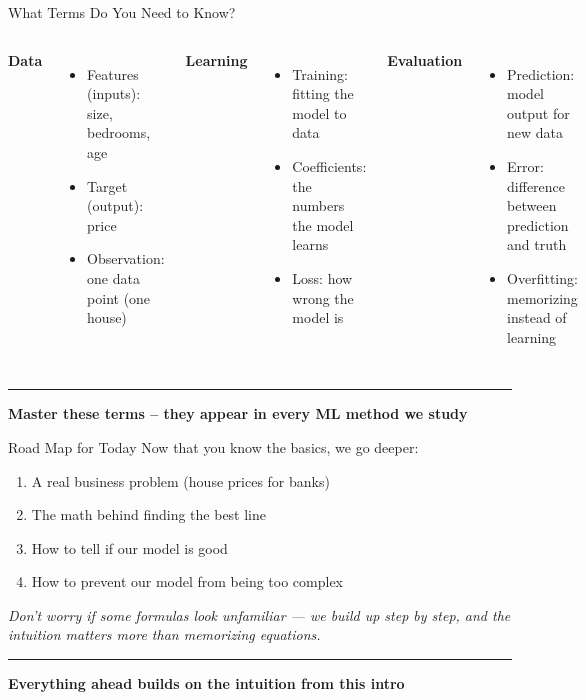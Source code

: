 \documentclass[8pt,aspectratio=169]{beamer}
\newcommand{\bottomnote}[1]{%
\vfill
\vspace{-2mm}
\textcolor{mllavender2}{\rule{\textwidth}{0.4pt}}
\vspace{1mm}
\footnotesize
\textbf{#1}
}
\newenvironment{compactlist}{%
  \begin{itemize}%
    \setlength{\itemsep}{2pt}%
    \setlength{\parskip}{0pt}%
    \setlength{\parsep}{0pt}%
}{%
  \end{itemize}%
}
\begin{document}
\begin{frame}[t]{What Terms Do You Need to Know?}
\begin{columns}[T]
\textbf{Data}

\begin{compactlist}
  \item Features (inputs): size, bedrooms, age
  \item Target (output): price
  \item Observation: one data point (one house)
\end{compactlist}

\textbf{Learning}

\begin{compactlist}
  \item Training: fitting the model to data
  \item Coefficients: the numbers the model learns
  \item Loss: how wrong the model is
\end{compactlist}

\textbf{Evaluation}

\begin{compactlist}
  \item Prediction: model output for new data
  \item Error: difference between prediction and truth
  \item Overfitting: memorizing instead of learning
\end{compactlist}
\end{columns}

\bottomnote{Master these terms -- they appear in every ML method we study}
\end{frame}

\begin{frame}[t]{Road Map for Today}
Now that you know the basics, we go deeper:

\begin{enumerate}
  \item A real business problem (house prices for banks)
  \item The math behind finding the best line
  \item How to tell if our model is good
  \item How to prevent our model from being too complex
\end{enumerate}

\vspace{0.5em}
\textit{Don't worry if some formulas look unfamiliar --- we build up step by step, and the intuition matters more than memorizing equations.}

\bottomnote{Everything ahead builds on the intuition from this intro}
\end{frame}
\end{document}
